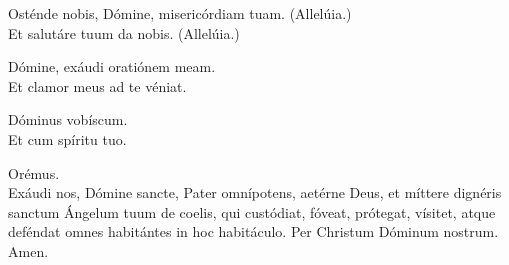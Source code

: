 \begin{minipage}{0.7\linewidth}
	\setlength{\parskip}{0.5em}
	\V Osténde nobis, Dómine, misericórdiam tuam. (Allelúia.)\\
	\R Et salutáre tuum da nobis. (Allelúia.)

	\V Dómine, exáudi oratiónem meam.\\
	\R Et clamor meus ad te véniat.

	\V Dóminus vobíscum.\\
	\R Et cum spíritu tuo.

	Orémus.\\
	Exáudi nos, Dómine sancte, Pater omnípotens, aetérne Deus,
	et míttere dignéris sanctum Ángelum tuum de coelis, qui custódiat,
	fóveat, prótegat, vísitet, atque deféndat omnes habitántes in hoc habitáculo.
	Per Christum Dóminum nostrum.\\
	\R Amen.
\end{minipage}
%
\begin{minipage}{0.05\linewidth}~\end{minipage}
%
\begin{minipage}{0.25\linewidth}
	\setlength{\parskip}{0.7em}

	\scriptsize{}
\end{minipage}
